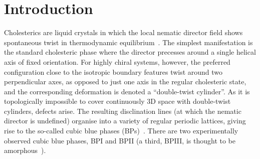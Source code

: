 \documentclass[8.5pt,twoside,twocolumn]{article}
\begin{document}




\section{Introduction}

Cholesterics are liquid crystals in which the local nematic director field shows spontaneous 
twist in thermodynamic equilibrium~\cite{deGennes}. 
The simplest manifestation is the standard cholesteric phase where the
director precesses around a single helical axis of fixed orientation.
For highly chiral systems, however,
the preferred configuration close 
to the isotropic boundary features twist around two perpendicular axes, as opposed to 
just one axis in the regular cholesteric state, and the corresponding deformation is 
denoted a ``double-twist cylinder''.
As it is topologically impossible to cover continuously 3D space with double-twist 
cylinders, defects arise. The resulting disclination lines (at which the
nematic director is undefined)
 organise into a variety of regular periodic lattices, 
giving rise to the so-called cubic blue phases (BPs)~\cite{Grebel:1984,Wright:1989}. 
There are two experimentally observed cubic blue phases, BPI and BPII (a third, BPIII, 
is thought to be amorphous~\cite{Henrich:2011a}).
\end{document}
